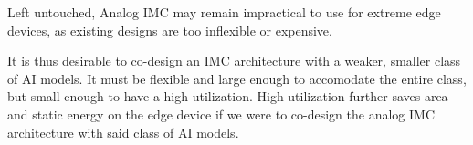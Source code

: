 Left untouched, Analog IMC may remain impractical to use for extreme edge devices, as existing designs are too inflexible or expensive. 

It is thus desirable to co-design an IMC architecture with a weaker, smaller class of AI models. It must be flexible and large enough to accomodate the entire class, but small enough to have a high utilization. High utilization further saves area and static energy on the edge device if we were to co-design the analog IMC architecture with said class of AI models. 